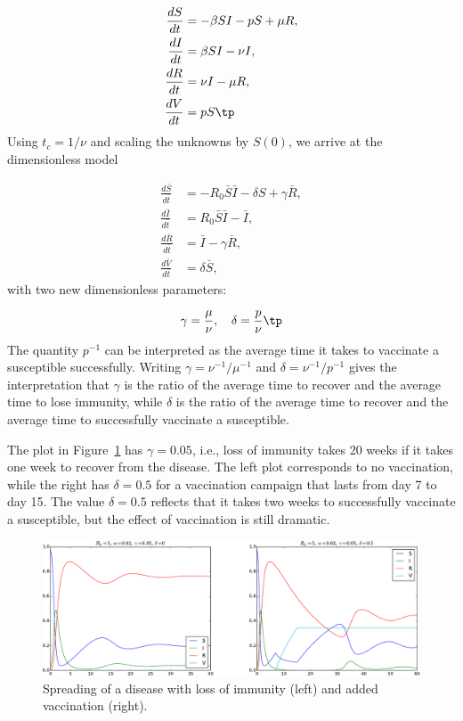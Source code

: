 \documentclass[graybox,envcountchap,sectrefs,final]{svmonodo}
\begin{document}
\begin{align}
\frac{dS}{dt} &= - \beta SI - pS + \mu R,
\label{scale:SIRV:S}\\ 
\frac{dI}{dt} &= \beta SI - \nu I,
\label{scale:SIRV:I}\\ 
\frac{dR}{dt} &= \nu I -\mu R,
\label{scale:SIRV:R}\\ 
\frac{dV}{dt} &= p S\tp
\label{scale:SIRV:V}
\end{align}
Using $t_c=1/\nu$ and scaling the unknowns by $S(0)$, we arrive at
the dimensionless model

\begin{align}
\frac{d\bar S}{d\bar t} &= - R_0 \bar S \bar I - \delta S + \gamma \bar R,
\label{scale:SIRV:S2}\\ 
\frac{d\bar I}{d\bar t} &= R_0 \bar S \bar I - \bar I,
\label{scale:SIRV:I2}\\ 
\frac{d\bar R}{d\bar t} &= \bar I -\gamma \bar R,
\label{scale:SIRV:R2}\\ 
\frac{d\bar V}{d\bar t} &= \delta \bar S,
\label{scale:SIRV:V2}
\end{align}
with two new dimensionless parameters:

\[ \gamma = \frac{\mu}{\nu},\quad \delta = \frac{p}{\nu}\tp \]
The quantity $p^{-1}$ can be interpreted as the average time it takes
to vaccinate a susceptible successfully. Writing $\gamma = \nu^{-1}/\mu^{-1}$
and $\delta = \nu^{-1}/p^{-1}$ gives the interpretation that $\gamma$
is the ratio of the average time to recover and the average time to
lose immunity, while $\delta$ is the ratio of the average time to recover
and the average time to successfully vaccinate a susceptible.

The plot in Figure~\ref{sec:scale:SIRV:fig} has $\gamma = 0.05$, i.e.,
loss of immunity takes 20 weeks if it takes one week to recover from
the disease. The left plot corresponds to no vaccination, while the
right has $\delta = 0.5$ for a vaccination campaign that lasts from
day 7 to day 15. The value $\delta =0.5$ reflects that
it takes two weeks to successfully
vaccinate a susceptible, but the effect of vaccination is still dramatic.


\begin{figure}[!ht]  %
  \centerline{\includegraphics[width=1.0\linewidth]{fig-scaling/SIRV2.pdf}}
  \caption{
  Spreading of a disease with loss of immunity (left) and added vaccination (right). \label{sec:scale:SIRV:fig}
  }
\end{figure}
\end{document}
